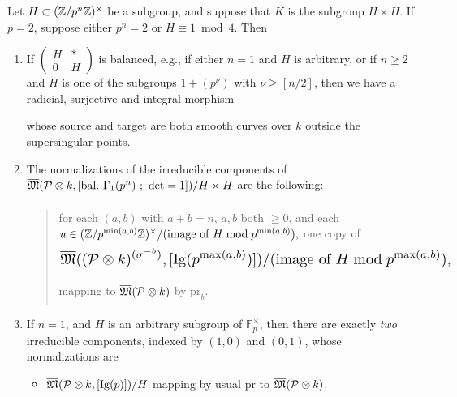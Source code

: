 \begin{kcor}\label{cor:13.12.4}
Let $H \subset (\mathbb{Z}/p^n\mathbb{Z})^\times$ be a subgroup, and suppose that $K$ is the subgroup $H \times H$. If $p = 2$, suppose either $p^n = 2$ or $H \equiv 1 \bmod 4$. Then
\begin{enumerate}[(1)]
\item If $\begin{pmatrix} H & * \\ 0 & H \end{pmatrix}$ is balanced, e.g., if either $n = 1$ and $H$ is arbitrary, or if $n \ge 2$ and $H$ is one of the subgroups $1 + (p^\nu)$ with $\nu \ge [n/2]$, then we have a radicial, surjective and integral morphism
\begin{center}
\end{center}
whose source and target are both smooth curves over $k$ outside the supersingular points.
\item The normalizations of the irreducible components of $\overline{\mathfrak{M}}(\mathcal{P} \underset{}{\otimes} k, [\mathrm{bal.\ }\Gamma_1(p^n)\ ;\ \det = 1]) / H \times H$ are the following:
\begin{quote}
for each $(a,b)$ with $a+b = n$, $a,b$ both $\ge 0$, and each $u \in (\mathbb{Z}/p^{\min(a,b)}\mathbb{Z})^\times / (\text{image of } H \bmod p^{\min(a,b)}) ,$ one copy of
\[
\resizebox{\linewidth}{!}{$\displaystyle
\overline{\mathfrak{M}}((\mathcal{P} \tens{} k)^{(\sigma^{-b})}, [\mathrm{Ig}(p^{\max(a,b)})]) / (\text{image of } H \bmod p^{\max(a,b)}) ,
$}
\]
mapping to $\overline{\mathfrak{M}}(\mathcal{P} \underset{}{\otimes} k)$ by $\mathrm{pr}_b$.
\end{quote}
\item If $n = 1$, and $H$ is an arbitrary subgroup of $\mathbb{F}_p^\times$, then there are exactly \emph{two} irreducible components, indexed by $(1,0)$ and $(0,1)$, whose normalizations are
\begin{itemize}[leftmargin=2.5em]
\item[$(1,0)$~:] $\overline{\mathfrak{M}}(\mathcal{P} \underset{}{\otimes} k, [\mathrm{Ig}(p)])/H$ mapping by usual $\mathrm{pr}$ to $\overline{\mathfrak{M}}(\mathcal{P} \underset{}{\otimes} k)$.

\end{itemize}
\end{enumerate}
\end{kcor}
